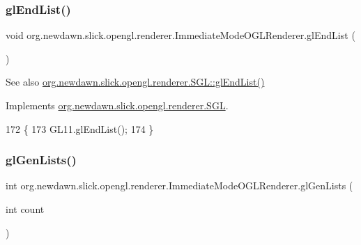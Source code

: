 \subsubsection{\texorpdfstring{gl\+End\+List()}{glEndList()}}
{\footnotesize\ttfamily void org.\+newdawn.\+slick.\+opengl.\+renderer.\+Immediate\+Mode\+O\+G\+L\+Renderer.\+gl\+End\+List (\begin{DoxyParamCaption}{ }\end{DoxyParamCaption})\hspace{0.3cm}{\ttfamily [inline]}}

\begin{DoxySeeAlso}{See also}
\mbox{\hyperlink{interfaceorg_1_1newdawn_1_1slick_1_1opengl_1_1renderer_1_1_s_g_l_a300a1d9b3c984ccc0a59eb951821bf37}{org.\+newdawn.\+slick.\+opengl.\+renderer.\+S\+G\+L\+::gl\+End\+List()}} 
\end{DoxySeeAlso}


Implements \mbox{\hyperlink{interfaceorg_1_1newdawn_1_1slick_1_1opengl_1_1renderer_1_1_s_g_l_a300a1d9b3c984ccc0a59eb951821bf37}{org.\+newdawn.\+slick.\+opengl.\+renderer.\+S\+GL}}.


\begin{DoxyCode}
172                             \{
173         GL11.glEndList();
174     \}
\end{DoxyCode}
\mbox{\label{classorg_1_1newdawn_1_1slick_1_1opengl_1_1renderer_1_1_immediate_mode_o_g_l_renderer_af14eac568c10241542cceb2df678e91d}} 
\subsubsection{\texorpdfstring{gl\+Gen\+Lists()}{glGenLists()}}
{\footnotesize\ttfamily int org.\+newdawn.\+slick.\+opengl.\+renderer.\+Immediate\+Mode\+O\+G\+L\+Renderer.\+gl\+Gen\+Lists (\begin{DoxyParamCaption}\item[{int}]{count }\end{DoxyParamCaption})\hspace{0.3cm}{\ttfamily [inline]}}

